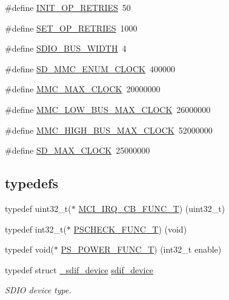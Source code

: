 \begin{DoxyCompactItemize}
\item 
\#define \hyperlink{group___s_d_i_f__18_x_x__43_x_x_gaa5c496657573274b20f193c92686cd67}{I\+N\+I\+T\+\_\+\+O\+P\+\_\+\+R\+E\+T\+R\+I\+ES}~50
\item 
\#define \hyperlink{group___s_d_i_f__18_x_x__43_x_x_ga4a275cd0d77af6a3ec9fa04f040c8d99}{S\+E\+T\+\_\+\+O\+P\+\_\+\+R\+E\+T\+R\+I\+ES}~1000
\item 
\#define \hyperlink{group___s_d_i_f__18_x_x__43_x_x_gadf0203becc22d5e88d858933cc32f734}{S\+D\+I\+O\+\_\+\+B\+U\+S\+\_\+\+W\+I\+D\+TH}~4
\item 
\#define \hyperlink{group___s_d_i_f__18_x_x__43_x_x_ga495b4ec71ba467ec70b848dd658f0733}{S\+D\+\_\+\+M\+M\+C\+\_\+\+E\+N\+U\+M\+\_\+\+C\+L\+O\+CK}~400000
\item 
\#define \hyperlink{group___s_d_i_f__18_x_x__43_x_x_ga6efbc115fac65c191a0bb3cc9b90ad59}{M\+M\+C\+\_\+\+M\+A\+X\+\_\+\+C\+L\+O\+CK}~20000000
\item 
\#define \hyperlink{group___s_d_i_f__18_x_x__43_x_x_ga65bf7243fd919508d7d7b9ac358269cf}{M\+M\+C\+\_\+\+L\+O\+W\+\_\+\+B\+U\+S\+\_\+\+M\+A\+X\+\_\+\+C\+L\+O\+CK}~26000000
\item 
\#define \hyperlink{group___s_d_i_f__18_x_x__43_x_x_gaa5cd31be8a759d4fb47a1b46fc5350c3}{M\+M\+C\+\_\+\+H\+I\+G\+H\+\_\+\+B\+U\+S\+\_\+\+M\+A\+X\+\_\+\+C\+L\+O\+CK}~52000000
\item 
\#define \hyperlink{group___s_d_i_f__18_x_x__43_x_x_ga50ae496516159edcb24dde1c947f1865}{S\+D\+\_\+\+M\+A\+X\+\_\+\+C\+L\+O\+CK}~25000000
\end{DoxyCompactItemize}
\subsection*{\textquotesingle{}typedefs\textquotesingle{}}
\begin{DoxyCompactItemize}
\item 
typedef uint32\+\_\+t($\ast$ \hyperlink{group___s_d_i_f__18_x_x__43_x_x_ga5f35531a919c15d7f2015bb06c7c268c}{M\+C\+I\+\_\+\+I\+R\+Q\+\_\+\+C\+B\+\_\+\+F\+U\+N\+C\+\_\+T}) (uint32\+\_\+t)
\item 
typedef int32\+\_\+t($\ast$ \hyperlink{group___s_d_i_f__18_x_x__43_x_x_ga3a32ffbe111e1b16b9efd08aee03727e}{P\+S\+C\+H\+E\+C\+K\+\_\+\+F\+U\+N\+C\+\_\+T}) (void)
\item 
typedef void($\ast$ \hyperlink{group___s_d_i_f__18_x_x__43_x_x_ga9f9a94c5b4812b8fdc5aa4a808e9ceaf}{P\+S\+\_\+\+P\+O\+W\+E\+R\+\_\+\+F\+U\+N\+C\+\_\+T}) (int32\+\_\+t enable)
\item 
typedef struct \hyperlink{struct__sdif__device}{\+\_\+sdif\+\_\+device} \hyperlink{group___s_d_i_f__18_x_x__43_x_x_ga14a605aa797cde1201ae414437a32292}{sdif\+\_\+device}
\begin{DoxyCompactList}\small\item\em S\+D\+IO device type. \end{DoxyCompactList}\end{DoxyCompactItemize}

